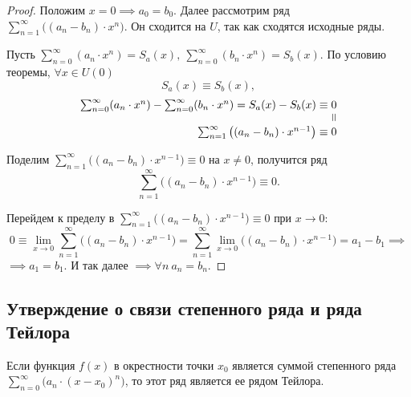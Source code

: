 \begin{proof}
    Положим $x = 0 \implies a_0 = b_0$. Далее рассмотрим ряд $\sum_{n=1}^{\infty}\big((a_n - b_n) \cdot x^n\big)$. Он сходится на $U$, так как сходятся исходные ряды.

    Пусть $\sum_{n=0}^{\infty}(a_n \cdot x^n) = S_a(x), \ \sum_{n=0}^{\infty}(b_n \cdot x^n) = S_b(x)$. По условию теоремы, $\forall x \in U(0) $
    \[
        S_a(x) \equiv S_b(x),
    \]
    \[
        \begin{array}{r}
            \sum_{n=0}^{\infty}(a_n \cdot x^n) - \sum_{n=0}^{\infty}(b_n \cdot x^n) = S_a(x) - S_b(x) \equiv 0 \\
            \verteq                                                                                            \\
            \sum_{n=1}^{\infty}\big((a_n - b_n) \cdot x^{n-1}\big) \equiv 0
        \end{array}
    \]

    Поделим $\sum_{n=1}^{\infty}\big((a_n - b_n) \cdot x^{n-1}\big) \equiv 0$ на $x \ne 0$, получится ряд
    \[
        \sum_{n=1}^{\infty}\big((a_n - b_n) \cdot x^{n-1}\big) \equiv 0.
    \]

    Перейдем к пределу в $\sum_{n=1}^{\infty}\big((a_n - b_n) \cdot x^{n-1}\big) \equiv 0$ при $x \rightarrow 0$:
    \[
        0 \equiv \underset{x\rightarrow0}{\lim}\sum_{n=1}^{\infty}\big((a_n - b_n) \cdot x^{n-1}\big) = \sum_{n=1}^{\infty}\underset{x\rightarrow0}{\lim}\big((a_n - b_n) \cdot x^{n-1} \big) = a_1 - b_1 \implies
    \]
    $\implies a_1 = b_1$. И так далее $\implies \forall n \ a_n = b_n$.
\end{proof}

\setcounter{subsection}{101}

\subsection{Утверждение о связи степенного ряда и ряда Тейлора}

\begin{statement}
    Если функция $f(x)$ в окрестности точки $x_0$ является суммой степенного ряда $\sum_{n=0}^{\infty}\big(a_n \cdot (x-x_0)^n\big)$, то этот ряд является ее рядом Тейлора.
\end{statement}

